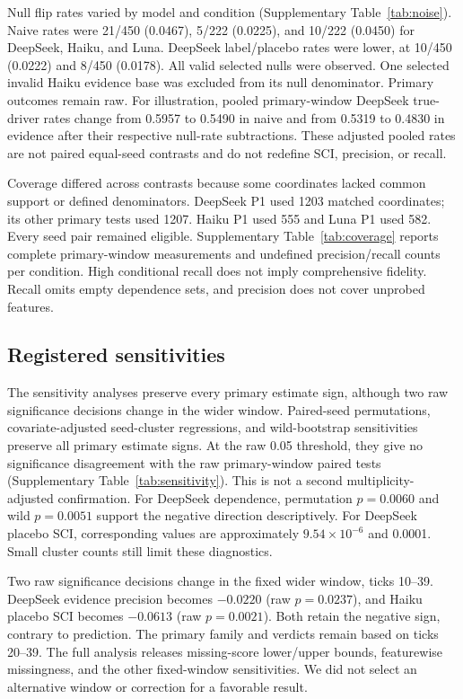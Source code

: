 \documentclass[a4paper]{article}
\begin{document}
Null flip rates varied by model and condition (Supplementary Table~\ref{tab:noise}). Naive rates were 21/450 (0.0467), 5/222 (0.0225), and 10/222 (0.0450) for DeepSeek, Haiku, and Luna. DeepSeek label/placebo rates were lower, at 10/450 (0.0222) and 8/450 (0.0178). All valid selected nulls were observed. One selected invalid Haiku evidence base was excluded from its null denominator. Primary outcomes remain raw. For illustration, pooled primary-window DeepSeek true-driver rates change from 0.5957 to 0.5490 in naive and from 0.5319 to 0.4830 in evidence after their respective null-rate subtractions. These adjusted pooled rates are not paired equal-seed contrasts and do not redefine SCI, precision, or recall.

Coverage differed across contrasts because some coordinates lacked common support or defined denominators. DeepSeek P1 used 1203 matched coordinates; its other primary tests used 1207. Haiku P1 used 555 and Luna P1 used 582. Every seed pair remained eligible. Supplementary Table~\ref{tab:coverage} reports complete primary-window measurements and undefined precision/recall counts per condition. High conditional recall does not imply comprehensive fidelity. Recall omits empty dependence sets, and precision does not cover unprobed features.

\subsection{Registered sensitivities}\label{sec:sensitivities}
The sensitivity analyses preserve every primary estimate sign, although two raw significance decisions change in the wider window. Paired-seed permutations, covariate-adjusted seed-cluster regressions, and wild-bootstrap sensitivities preserve all primary estimate signs. At the raw 0.05 threshold, they give no significance disagreement with the raw primary-window paired tests (Supplementary Table~\ref{tab:sensitivity}). This is not a second multiplicity-adjusted confirmation. For DeepSeek dependence, permutation $p=0.0060$ and wild $p=0.0051$ support the negative direction descriptively. For DeepSeek placebo SCI, corresponding values are approximately $9.54\times10^{-6}$ and 0.0001. Small cluster counts still limit these diagnostics.

Two raw significance decisions change in the fixed wider window, ticks 10--39. DeepSeek evidence precision becomes $-0.0220$ (raw $p=0.0237$), and Haiku placebo SCI becomes $-0.0613$ (raw $p=0.0021$). Both retain the negative sign, contrary to prediction. The primary family and verdicts remain based on ticks 20--39. The full analysis releases missing-score lower/upper bounds, featurewise missingness, and the other fixed-window sensitivities. We did not select an alternative window or correction for a favorable result.
\end{document}
